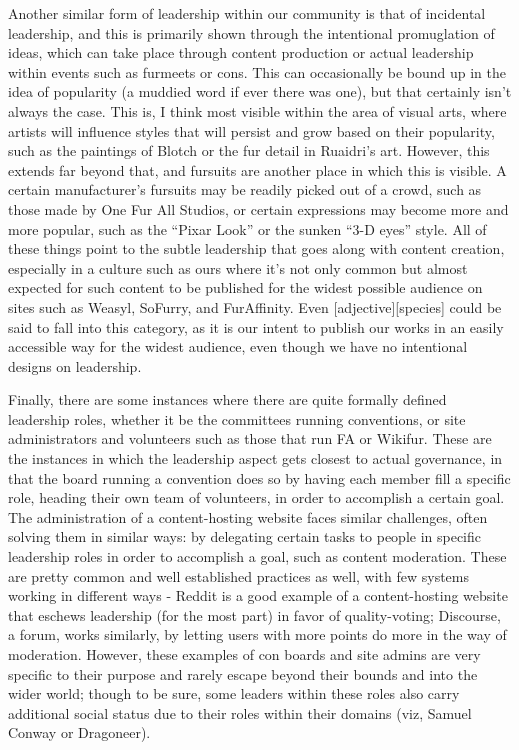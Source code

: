 Another similar form of leadership within our community is that of incidental leadership, and this is primarily shown through the intentional promuglation of ideas, which can take place through content production or actual leadership within events such as furmeets or cons. This can occasionally be bound up in the idea of popularity (a muddied word if ever there was one), but that certainly isn't always the case. This is, I think most visible within the area of visual arts, where artists will influence styles that will persist and grow based on their popularity, such as the paintings of Blotch or the fur detail in Ruaidri's art. However, this extends far beyond that, and fursuits are another place in which this is visible. A certain manufacturer's fursuits may be readily picked out of a crowd, such as those made by One Fur All Studios, or certain expressions may become more and more popular, such as the ``Pixar Look'' or the sunken ``3-D eyes'' style. All of these things point to the subtle leadership that goes along with content creation, especially in a culture such as ours where it's not only common but almost expected for such content to be published for the widest possible audience on sites such as Weasyl, SoFurry, and FurAffinity. Even {[}adjective{]}{[}species{]} could be said to fall into this category, as it is our intent to publish our works in an easily accessible way for the widest audience, even though we have no intentional designs on leadership.

Finally, there are some instances where there are quite formally defined leadership roles, whether it be the committees running conventions, or site administrators and volunteers such as those that run FA or Wikifur. These are the instances in which the leadership aspect gets closest to actual governance, in that the board running a convention does so by having each member fill a specific role, heading their own team of volunteers, in order to accomplish a certain goal. The administration of a content-hosting website faces similar challenges, often solving them in similar ways: by delegating certain tasks to people in specific leadership roles in order to accomplish a goal, such as content moderation. These are pretty common and well established practices as well, with few systems working in different ways - Reddit is a good example of a content-hosting website that eschews leadership (for the most part) in favor of quality-voting; Discourse, a forum, works similarly, by letting users with more points do more in the way of moderation. However, these examples of con boards and site admins are very specific to their purpose and rarely escape beyond their bounds and into the wider world; though to be sure, some leaders within these roles also carry additional social status due to their roles within their domains (viz, Samuel Conway or Dragoneer).

